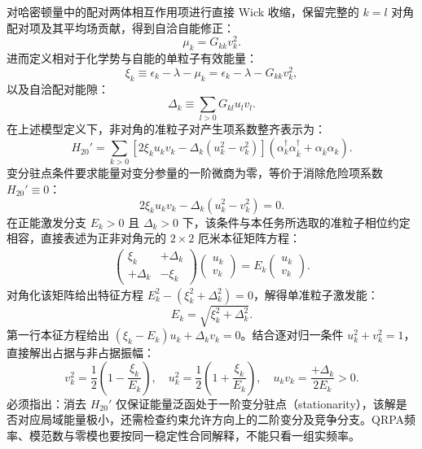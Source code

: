 对哈密顿量中的配对两体相互作用项进行直接 Wick 收缩，保留完整的 $k=l$ 对角配对项及其平均场贡献，得到自洽自能修正：
\begin{equation}\label{eq:2-3-16}
\mu_k = G_{kk} v_k^2.
\end{equation}
进而定义相对于化学势与自能的单粒子有效能量：
\begin{equation}\label{eq:2-3-17}
\xi_k \equiv \epsilon_k - \lambda - \mu_k = \epsilon_k - \lambda - G_{kk} v_k^2,
\end{equation}
以及自洽配对能隙：
\begin{equation}\label{eq:2-3-18}
\Delta_k \equiv \sum_{l > 0} G_{kl} u_l v_l.
\end{equation}
在上述模型定义下，非对角的准粒子对产生项系数整齐表示为：
\begin{equation}\label{eq:2-3-19}
H_{20}' = \sum_{k>0} \left[ 2\xi_k u_k v_k - \Delta_k (u_k^2 - v_k^2) \right] \left( \alpha_k^\dagger \alpha_{\bar{k}}^\dagger + \alpha_{\bar{k}} \alpha_k \right).
\end{equation}
变分驻点条件要求能量对变分参量的一阶微商为零，等价于消除危险项系数 $H_{20}' \equiv 0$：
\begin{equation}\label{eq:2-3-20}
2\xi_k u_k v_k - \Delta_k (u_k^2 - v_k^2) = 0.
\end{equation}
在正能激发分支 $E_k > 0$ 且 $\Delta_k > 0$ 下，该条件与本任务所选取的准粒子相位约定相容，直接表述为正非对角元的 $2\times 2$ 厄米本征矩阵方程：
\begin{align}\label{eq:2-3-21}
\begin{pmatrix}
\xi_k & +\Delta_k \\
+\Delta_k & -\xi_k
\end{pmatrix}
\begin{pmatrix}
u_k \\
v_k
\end{pmatrix}
= E_k
\begin{pmatrix}
u_k \\
v_k
\end{pmatrix}.
\end{align}
对角化该矩阵给出特征方程 $E_k^2 - (\xi_k^2 + \Delta_k^2) = 0$，解得单准粒子激发能：
\begin{equation}\label{eq:2-3-22}
E_k = \sqrt{\xi_k^2 + \Delta_k^2}.
\end{equation}
第一行本征方程给出 $(\xi_k - E_k) u_k + \Delta_k v_k = 0$。结合逐对归一条件 $u_k^2 + v_k^2 = 1$，直接解出占据与非占据振幅：
\begin{equation}\label{eq:2-3-23}
v_k^2 = \frac{1}{2} \left( 1 - \frac{\xi_k}{E_k} \right), \quad u_k^2 = \frac{1}{2} \left( 1 + \frac{\xi_k}{E_k} \right), \quad u_k v_k = \frac{+\Delta_k}{2 E_k} > 0.
\end{equation}
必须指出：消去 $H_{20}'$ 仅保证能量泛函处于一阶变分驻点（stationarity），该解是否对应局域能量极小，还需检查约束允许方向上的二阶变分及竞争分支。QRPA频率、模范数与零模也要按同一稳定性合同解释，不能只看一组实频率。



